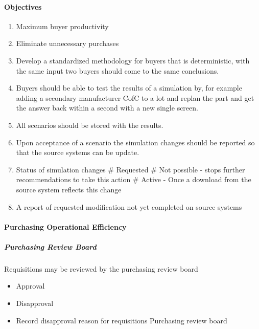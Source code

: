 \documentclass[letterpaper,10pt,english]{sphinxmanual}
\begin{document}
\paragraph{Objectives}
\label{\detokenize{FutureState:objectives}}\begin{enumerate}
%
\item {} 
Maximum buyer productivity

\item {} 
Eliminate unnecessary purchases

\item {} 
Develop a standardized methodology for buyers that is deterministic,
with the same input two buyers should come to the same conclusions.

\item {} 
Buyers should be able to test the results of a simulation by, for
example adding a secondary manufacturer CofC to a lot and replan the
part and get the answer back within a second with a new single
screen.

\item {} 
All scenarios should be stored with the results.

\item {} 
Upon acceptance of a scenario the simulation changes should be
reported so that the source systems can be update.

\item {} 
Status of simulation changes \# Requested \# Not possible - stops
further recommendations to take this action \# Active - Once a
download from the source system reflects this change

\item {} 
A report of requested modification not yet completed on source
systems

\end{enumerate}


\paragraph{Purchasing Operational Efficiency}
\label{\detokenize{FutureState:purchasing-operational-efficiency}}

\subparagraph{Purchasing Review Board}
\label{\detokenize{FutureState:purchasing-review-board}}
Requisitions may be reviewed by the purchasing review board
\begin{itemize}
\item {} 
Approval

\item {} 
Disapproval

\item {} 
Record disapproval reason for requisitions Purchasing review board

\end{itemize}
\end{document}
